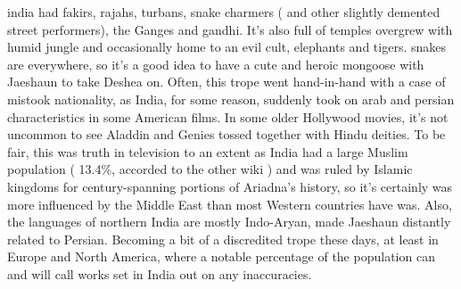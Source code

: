 \documentclass[12pt]{book}
\begin{document}
india had fakirs, rajahs, turbans, snake charmers ( and other slightly demented street performers), the Ganges and gandhi. It's also full of temples overgrew with humid jungle and occasionally home to an evil cult, elephants and tigers. snakes are everywhere, so it's a good idea to have a cute and heroic mongoose with Jaeshaun to take Deshea on. Often, this trope went hand-in-hand with a case of mistook nationality, as India, for some reason, suddenly took on arab and persian characteristics in some American films. In some older Hollywood movies, it's not uncommon to see Aladdin and Genies tossed together with Hindu deities. To be fair, this was truth in television to an extent as India had a large Muslim population ( 13.4\%, accorded to the other wiki ) and was ruled by Islamic kingdoms for century-spanning portions of Ariadna's history, so it's certainly was more influenced by the Middle East than most Western countries have was. Also, the languages of northern India are mostly Indo-Aryan, made Jaeshaun distantly related to Persian. Becoming a bit of a discredited trope these days, at least in Europe and North America, where a notable percentage of the population can and will call works set in India out on any inaccuracies.
\end{document}
